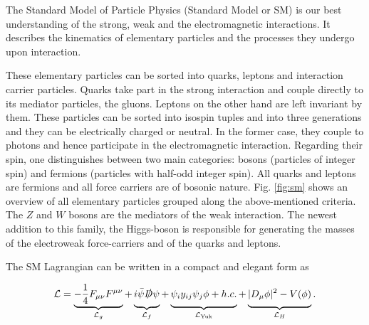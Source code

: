 \label{ch:theory}


The Standard Model of Particle Physics (Standard Model or SM) is our best understanding of the strong, weak and the electromagnetic interactions. It describes the kinematics of elementary particles and the processes they undergo upon interaction.

These elementary particles can be sorted into quarks, leptons and interaction carrier particles. Quarks take part in the strong interaction and couple directly to its mediator particles, the gluons. Leptons on the other hand are left invariant by them. These particles can be sorted into isospin tuples and into three generations and they can be electrically charged or neutral. In the former case, they couple to photons and hence participate in the electromagnetic interaction. Regarding their spin, one distinguishes between two main categories: bosons (particles of integer spin) and fermions (particles with half-odd integer spin). All quarks and leptons are fermions and all force carriers are of bosonic nature. Fig. \ref{fig:sm} shows an overview of all elementary particles grouped along the above-mentioned criteria. The $Z$ and $W$ bosons are the mediators of the weak interaction. The newest addition to this family, the Higgs-boson is responsible for generating the masses of the electroweak force-carriers and of the quarks and leptons.

The SM Lagrangian can be written in a compact and elegant form as


\begin{equation}
		\mathcal{L} = \underbrace{-\frac{1}{4}F_{\mu\nu}F^{\mu\nu}}_{\mathcal{L}_g} + \underbrace{\vphantom{-\frac{1}{4}F_{\mu\nu}F^{\mu\nu}}i \bar{\psi}\slashed{D}\psi}_{\mathcal{L}_f} + \underbrace{\vphantom{-\frac{1}{4}F_{\mu\nu}F^{\mu\nu}}\psi_iy_{ij}\psi_j\phi + h.c.}_{\mathcal{L}_\text{Yuk}} + \underbrace{\vphantom{-\frac{1}{4}F_{\mu\nu}F^{\mu\nu}}|D_\mu\phi|^2 - V(\phi)}_{\mathcal{L}_H}.
	\label{eq:lagrangian}
\end{equation}

